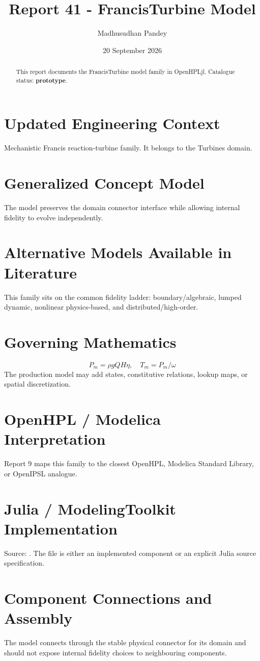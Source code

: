 \documentclass[10pt,a4paper]{article}
\title{Report 41 - FrancisTurbine Model}
\author{Madhusudhan Pandey}
\date{20 September 2026}
\begin{document}
\maketitle
\begin{abstract}This report documents the FrancisTurbine model family in OpenHPLjl. Catalogue status: \textbf{prototype}.\end{abstract}
\section{Updated Engineering Context}Mechanistic Francis reaction-turbine family. It belongs to the Turbines domain.
\section{Generalized Concept Model}The model preserves the domain connector interface while allowing internal fidelity to evolve independently.
\section{Alternative Models Available in Literature}This family sits on the common fidelity ladder: boundary/algebraic, lumped dynamic, nonlinear physics-based, and distributed/high-order.
\section{Governing Mathematics}\[P_m=\rho gQH\eta,\quad T_m=P_m/\omega\]The production model may add states, constitutive relations, lookup maps, or spatial discretization.
\section{OpenHPL / Modelica Interpretation}Report 9 maps this family to the closest OpenHPL, Modelica Standard Library, or OpenIPSL analogue.
\section{Julia / ModelingToolkit Implementation}Source: \texttt{}. The file is either an implemented component or an explicit Julia source specification.
\section{Component Connections and Assembly}The model connects through the stable physical connector for its domain and should not expose internal fidelity choices to neighbouring components.
\end{document}
